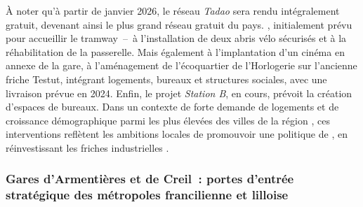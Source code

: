 \begin{refsegment}
{    À noter qu'à partir de janvier 2026, le réseau \textsl{Tadao} sera rendu intégralement gratuit, devenant ainsi le plus grand réseau gratuit du pays.
}, initialement prévu pour accueillir le tramway~–~à l'installation de deux abris vélo sécurisés et à la réhabilitation de la passerelle. Mais également à l'implantation d'un cinéma en annexe de la gare, à l'aménagement de l'écoquartier de l'Horlogerie sur l'ancienne friche Testut, intégrant logements, bureaux et structures sociales, avec une livraison prévue en 2024. Enfin, le projet \textsl{Station B}, en cours, prévoit la création d'espaces de bureaux. Dans un contexte de forte demande de logements et de croissance démographique parmi les plus élevées des villes de la région \textcolor{blue}{\autocite[32]{fnau_urbanisme_2008}}, ces interventions reflètent les ambitions locales de promouvoir une politique de , en réinvestissant les friches industrielles \textcolor{blue}{\autocite[38]{artois_mobilites_rapport_2024}}.%

\subsubsection*{Gares d'Armentières et de Creil~: portes d'entrée stratégique des métropoles francilienne et lilloise
    \label{chap3:application-observation-quantitative-armentieres-creil}
    }


\end{refsegment}
